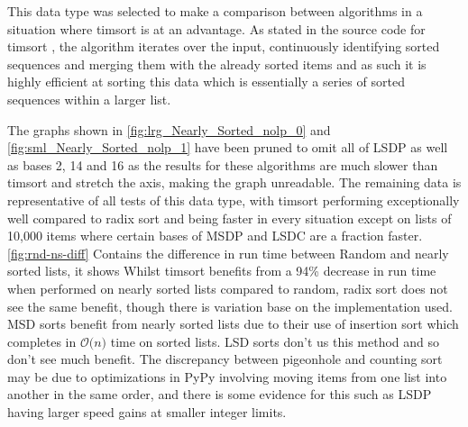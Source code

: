 \documentclass[12pt]{article}
\begin{document}
	This data type was selected to make a comparison between algorithms in a situation where timsort is at an advantage. As stated in the source code for timsort \cite{listsort}, the algorithm iterates over the input, continuously identifying sorted sequences and merging them with the already sorted items and as such it is highly efficient at sorting this data which is essentially a series of sorted sequences within a larger list.
	\par
	\pagebreak
	The graphs shown in \autoref{fig:lrg_Nearly_Sorted_nolp_0} and \autoref{fig:sml_Nearly_Sorted_nolp_1} have been pruned to omit all of LSD\textunderscore P as well as bases 2, 14 and 16 as the results for these algorithms are much slower than timsort and stretch the axis, making the graph unreadable. The remaining data is representative of all tests of this data type, with timsort performing exceptionally well compared to radix sort and being faster in every situation except on lists of 10,000 items where certain bases of MSD\textunderscore P and LSD\textunderscore C are a fraction faster.  	
	\autoref{fig:rnd-ns-diff} Contains the difference in run time between Random and nearly sorted lists, it shows Whilst timsort benefits from a 94\% decrease in run time when performed on nearly sorted lists compared to random, radix sort does not see the same benefit, though there is variation base on the implementation used. MSD sorts benefit from nearly sorted lists due to their use of insertion sort which completes in $\mathcal{O}\textit{(n)}$ time on sorted lists. LSD sorts don't us this method and so don't see much benefit. The discrepancy between pigeonhole and counting sort may be due to optimizations in PyPy involving moving items from one list into another in the same order, and there is some evidence for this such as LSD\textunderscore P having larger speed gains at smaller integer limits.
\end{document}
